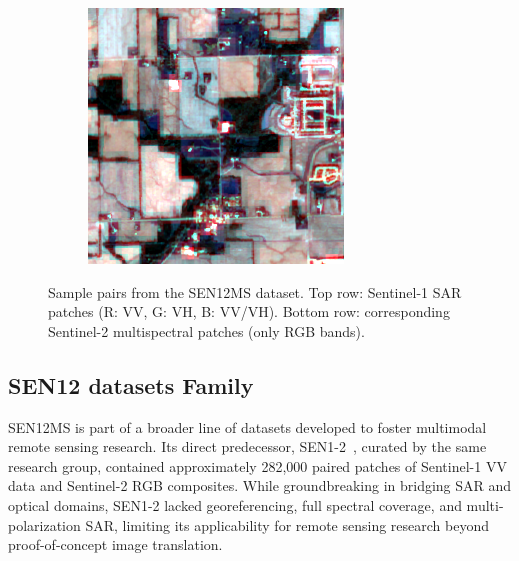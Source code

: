 \begin{figure}[h!]
\begin{subfigure}{0.18\textwidth}
    \end{subfigure}
    \begin{subfigure}{0.18\textwidth}
        \includegraphics[width=\linewidth]{img/ROIs1970_fall_s2_145_p100.png}
    \end{subfigure}

    \caption[Sample SAR–optical pairs from SEN12MS]{Sample pairs from the SEN12MS dataset. Top row: Sentinel-1 SAR patches (R: VV, G: VH, B: VV/VH). Bottom row: corresponding Sentinel-2 multispectral patches (only RGB bands).}
    \label{fig:sen12ms_pairs}
\end{figure}



\subsection{SEN12 datasets Family}
SEN12MS is part of a broader line of datasets developed to foster multimodal remote sensing research. Its direct predecessor, SEN1-2~\cite{sen12_2018}, curated by the same research group, contained approximately 282,000 paired patches of Sentinel-1 VV data and Sentinel-2 RGB composites. While groundbreaking in bridging SAR and optical domains, SEN1-2 lacked georeferencing, full spectral coverage, and multi-polarization SAR, limiting its applicability for remote sensing research beyond proof-of-concept image translation.

